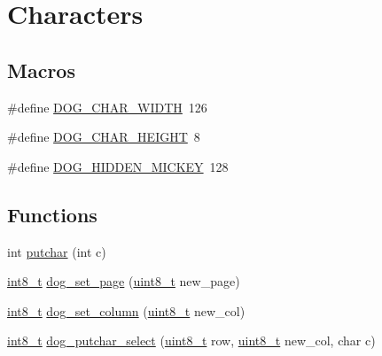 \hypertarget{group___d_o_g_m128__characters}{\section{Characters}
\label{group___d_o_g_m128__characters}
}
\subsection*{Macros}
\begin{DoxyCompactItemize}
\item 
\#define \hyperlink{group___d_o_g_m128__characters_gad07f9ec23024de01b6d0192908ac679f}{D\-O\-G\-\_\-\-C\-H\-A\-R\-\_\-\-W\-I\-D\-T\-H}~126
\item 
\#define \hyperlink{group___d_o_g_m128__characters_ga9bb126e85fbda49859cd103b0ff26112}{D\-O\-G\-\_\-\-C\-H\-A\-R\-\_\-\-H\-E\-I\-G\-H\-T}~8
\item 
\#define \hyperlink{group___d_o_g_m128__characters_ga303307bf233995e4a8e6db23cfb07108}{D\-O\-G\-\_\-\-H\-I\-D\-D\-E\-N\-\_\-\-M\-I\-C\-K\-E\-Y}~128
\end{DoxyCompactItemize}
\subsection*{Functions}
\begin{DoxyCompactItemize}
\item 
int \hyperlink{group___d_o_g_m128__characters_gaf4de2514b7778805db3815e8dd6cf09a}{putchar} (int c)
\item 
\hyperlink{group___d_o_g_m128__common_gaef44329758059c91c76d334e8fc09700}{int8\-\_\-t} \hyperlink{group___d_o_g_m128__characters_gac3a2ca99235c12bdcfb8bd827d0357c1}{dog\-\_\-set\-\_\-page} (\hyperlink{group___d_o_g_m128__common_gaba7bc1797add20fe3efdf37ced1182c5}{uint8\-\_\-t} new\-\_\-page)
\item 
\hyperlink{group___d_o_g_m128__common_gaef44329758059c91c76d334e8fc09700}{int8\-\_\-t} \hyperlink{group___d_o_g_m128__characters_gab8fcc42c02fb705ca5f3c7d94f98b303}{dog\-\_\-set\-\_\-column} (\hyperlink{group___d_o_g_m128__common_gaba7bc1797add20fe3efdf37ced1182c5}{uint8\-\_\-t} new\-\_\-col)
\item 
\hyperlink{group___d_o_g_m128__common_gaef44329758059c91c76d334e8fc09700}{int8\-\_\-t} \hyperlink{group___d_o_g_m128__characters_gad447ae4f91a86316726cea61c92156b2}{dog\-\_\-putchar\-\_\-select} (\hyperlink{group___d_o_g_m128__common_gaba7bc1797add20fe3efdf37ced1182c5}{uint8\-\_\-t} row, \hyperlink{group___d_o_g_m128__common_gaba7bc1797add20fe3efdf37ced1182c5}{uint8\-\_\-t} new\-\_\-col, char c)
\end{DoxyCompactItemize}



